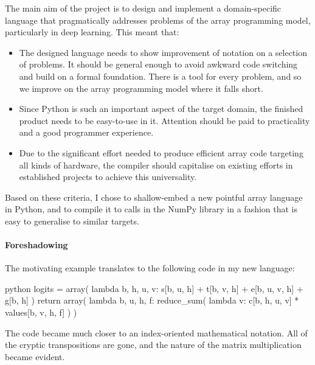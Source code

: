 The main aim of the project is to design and implement a domain-specific language that pragmatically addresses problems of the array programming model, particularly in deep learning. This meant that:
\begin{itemize}
    \item The designed language needs to show improvement of notation on a selection of problems. It should be general enough to avoid awkward code switching and build on a formal foundation. There is a tool for every problem, and so we improve on the array programming model where it falls short. 
    \item Since Python is such an important aspect of the target domain, the finished product needs to be easy-to-use in it. Attention should be paid to practicality and a good programmer experience.
    \item Due to the significant effort needed to produce efficient array code targeting all kinds of hardware, the compiler should capitalise on existing efforts in established projects to achieve this universality.
\end{itemize}
Based on these criteria, I chose to shallow-embed a new pointful array language in Python, and to compile it to calls in the NumPy library in a fashion that is easy to generalise to similar targets. 

\paragraph{Foreshadowing} The motivating example translates to the following code in my new language:
\begin{center}
\begin{cminted}{python}
logits = array(
    lambda b, h, u, v: s[b, u, h] + t[b, v, h] + e[b, u, v, h] + g[b, h]
)
return array(
    lambda b, u, h, f: reduce_sum(
        lambda v: c[b, h, u, v] * values[b, v, h, f]
    )
)
\end{cminted}
\end{center}
The code became much closer to an index-oriented mathematical notation. All of the cryptic transpositions are gone, and the nature of the matrix multiplication became evident.
